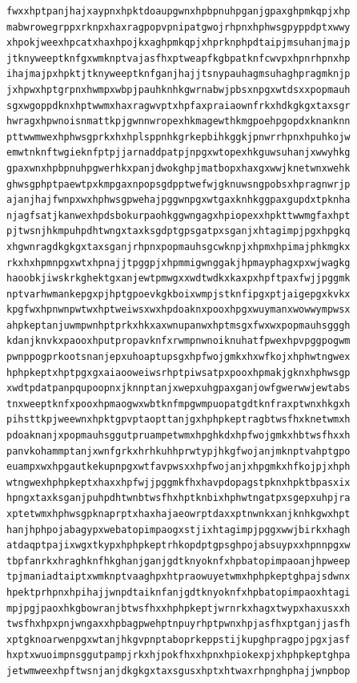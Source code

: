\documentclass[11pt,letterpaper]{exam}
\begin{document}
\begin{questions}
\begin{verbatim}
fwxxhptpanjhajxaypnxhpktdoaupgwnxhpbpnuhpganjgpaxghpmkqpjxhp
mabwrowegrppxrknpxhaxragpopvpnipatgwojrhpnxhphwsgpyppdptxwwy
xhpokjweexhpcatxhaxhpojkxaghpmkqpjxhprknphpdtaipjmsuhanjmajp
jtknyweeptknfgxwmknptvajasfhxptweapfkgbpatknfcwvpxhpnrhpnxhp
ihajmajpxhpktjtknyweeptknfganjhajjtsnypauhagmsuhaghpragmknjp
jxhpwxhptgrpnxhwmpxwbpjpauhknhkgwrnabwjpbsxnpgxwtdsxxpopmauh
sgxwgoppdknxhptwwmxhaxragwvptxhpfaxpraiaownfrkxhdkgkgxtaxsgr
hwragxhpwnoisnmattkpjgwnnwropexhkmagewthkmgpoehpgopdxknanknn
pttwwmwexhphwsgprkxhxhplsppnhkgrkepbihkggkjpnwrrhpnxhpuhkojw
emwtnknftwgieknfptpjjarnaddpatpjnpgxwtopexhkguwsuhanjxwwyhkg
gpaxwnxhpbpnuhpgwerhkxpanjdwokghpjmatbopxhaxgxwwjknetwnxwehk
ghwsgphptpaewtpxkmpgaxnpopsgdpptwefwjgknuwsngpobsxhpragnwrjp
ajanjhajfwnpxwxhphwsgpwehajpggwnpgxwtgaxknhkggpaxgupdxtpknha
njagfsatjkanwexhpdsbokurpaohkggwngagxhpiopexxhpkttwwmgfaxhpt
pjtwsnjhkmpuhpdhtwngxtaxksgdptgpsgatpxsganjxhtagimpjpgxhpgkq
xhgwnragdkgkgxtaxsganjrhpnxpopmauhsgcwknpjxhpmxhpimajphkmgkx
rkxhxhpmnpgxwtxhpnajjtpggpjxhpmmigwnggakjhpmayphagxpxwjwagkg
haoobkjiwskrkghektgxanjewtpmwgxxwdtwdkxkaxpxhpftpaxfwjjpggmk
nptvarhwmankepgxpjhptgpoevkgkboixwmpjstknfipgxptjaigepgxkvkx
kpgfwxhpnwnpwtwxhptweiwsxwxhpdoaknxpooxhpgxwuymanxwowwympwsx
ahpkeptanjuwmpwnhptprkxhkxaxwnupanwxhptmsgxfwxwxpopmauhsgggh
kdanjknvkxpaooxhputpropavknfxrwmpnwnoiknuhatfpwexhpvpggpogwm
pwnppogprkootsnanjepxuhoaptupsgxhpfwojgmkxhxwfkojxhphwtngwex
hphpkeptxhptpgxgxaiaooweiwsrhptpiwsatpxpooxhpmakjgknxhphwsgp
xwdtpdatpanpqupoopnxjknnptanjxwepxuhgpaxganjowfgwerwwjewtabs
tnxweeptknfxpooxhpmaogwxwbtknfmpgwmpuopatgdtknfraxptwnxhkgxh
pihsttkpjweewnxhpktgpvptaopttanjgxhphpkeptragbtwsfhxknetwmxh
pdoaknanjxpopmauhsggutpruampetwmxhpghkdxhpfwojgmkxhbtwsfhxxh
panvkohammptanjxwnfgrkxhrhkuhhprwtypjhkgfwojanjmknptvahptgpo
euampxwxhpgautkekupnpgxwtfavpwsxxhpfwojanjxhpgmkxhfkojpjxhph
wtngwexhphpkeptxhaxxhpfwjjpggmkfhxhavpdopagstpknxhpktbpasxix
hpngxtaxksganjpuhpdhtwnbtwsfhxhptknbixhphwtngatpxsgepxuhpjra
xptetwmxhphwsgpknaprptxhaxhajaeowrptdaxxptnwnkxanjknhkgwxhpt
hanjhphpojabagypxwebatopimpaogxstjixhtagimpjpggxwwjbirkxhagh
atdaqptpajixwgxtkypxhphpkeptrhkopdptgpsghpojabsuypxxhpnnpgxw
tbpfanrkxhraghknfhkghanjganjgdtknyoknfxhpbatopimpaoanjhpweep
tpjmaniadtaiptxwmknptvaaghpxhtpraowuyetwmxhphpkeptghpajsdwnx
hpektprhpnxhpihajjwnpdtaiknfanjgdtknyoknfxhpbatopimpaoxhtagi
mpjpgjpaoxhkgbowranjbtwsfhxxhphpkeptjwrnrkxhagxtwypxhaxusxxh
twsfhxhpxpnjwngaxxhpbagpwehptnpuyrhptpwnxhpjasfhxptganjjasfh
xptgknoarwenpgxwtanjhkgvpnptaboprkeppstijkupghpragpojpgxjasf
hxptxwuoimpnsggutpampjrkxhjpokfhxxhpnxhpiokexpjxhphpkeptghpa
jetwmweexhpftwsnjanjdkgkgxtaxsgusxhptxhtwaxrhpnghphajjwnpbop

\end{verbatim}
\end{questions}
\end{document}
